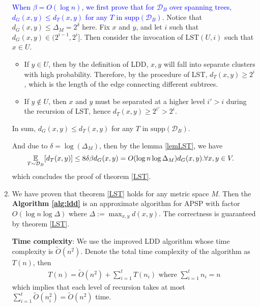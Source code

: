 \begin{answer}
\begin{enumerate}[label=\alph*).]
            \textcolor{blue}{When $\beta = O(\log n)$, we first prove that for $\mathcal{D}_B$ over spanning trees, $d_G(x,y) \le d_T(x,y)$ for any $T$ in  $\text{supp}(\mathcal{D}_B)$.}
            Notice that $d_G(x, y) \le \Delta_M = 2^\delta$ here. Fix $x$ and $y$, and let $i$ such that $d_G(x, y) \in (2^{i-1}, 2^i]$. 
            Then consider the invocation of $\mathrm{LST}(U, i)$ such that $x\in U$.
            \begin{itemize}
                \item If $y \in U$, then by the definition of LDD, $x,y$ will fall into separate clusters with high probability. Therefore, by the procedure of LST, $d_T(x,y) \ge 2^i$, which is the length of the edge connecting different subtrees.
                \item If $y \notin U$, then $x$ and $y$ must be separated at a higher level $i' > i$ during the recursion of LST, hence $d_T(x,y) \ge 2^{i'} > 2^i$.
            \end{itemize}
            In sum, $d_G(x,y) \le d_T(x,y)$ for any $T$ in  $\text{supp}(\mathcal{D}_B)$. 

            And due to $\delta = \log(\Delta_M)$, then by the lemma \ref{lemLST}, we have
            \begin{align*}
                \operatorname*{\mathbb{E}}_{T\sim \mathcal{D}_B}[d_T(x,y)] &\le 8\delta\beta d_G(x,y) = O(\log n \log \Delta_M) d_G(x,y). \forall x,y \in V.
            \end{align*}
            which concludes the proof of theorem \ref{LST}.
        \item We have proven that theorem \ref{LST} holds for any metric space $M$. Then the \textbf{Algorithm \ref{alg:ldd}} is an approximate algorithm for APSP with factor $O(\log n \log \Delta)$ where $\Delta := \max_{x,y} d(x,y)$.
        The correctness is guaranteed by theorem \ref{LST}. 

        \textbf{Time complexity}: We use the improved LDD algorithm whose time complexity is $\tilde{O}(n^2)$.
        Denote the total time complexity of the algorithm as $T(n)$, then 
        \begin{align*}
            T(n) = \tilde{O}(n^2) + \sum_{i=1}^t T(n_i) \text{ where } \sum_{i=1}^{t} n_i = n 
        \end{align*} 
        which implies that each level of recursion takes at most $\sum_{i=1}^{t} \tilde{O}(n_i^2) = \tilde{O}(n^2)$ time.


\end{enumerate}
\end{answer}
